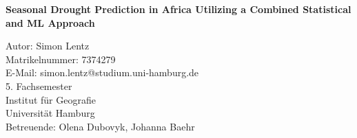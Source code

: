 \documentclass[11pt,a4paper, bibliography=totocnumbered]{scrreport}
\begin{document}
\begin{titlepage}

	\vspace*{5cm}

	\begin{centering}

		\Huge\textbf{Seasonal Drought Prediction in Africa Utilizing a Combined Statistical and ML Approach}

	\end{centering}

	\vspace*{6cm}

	\noindent Autor: Simon Lentz \\
	Matrikelnummer: 7374279 \\
	E-Mail: simon.lentz@studium.uni-hamburg.de \\
	5. Fachsemester \\
	Institut für Geografie \\
	Universität Hamburg \\
	Betreuende: Olena Dubovyk, Johanna Baehr




	\vspace{1cm}

\end{titlepage}


\newpage
\begin{doublespacing}
	\tableofcontents
\end{doublespacing}

\thispagestyle{empty}
\addtocounter{page}{-2}
\newpage













\newpage
\printbibliography
\newpage


\end{document}
